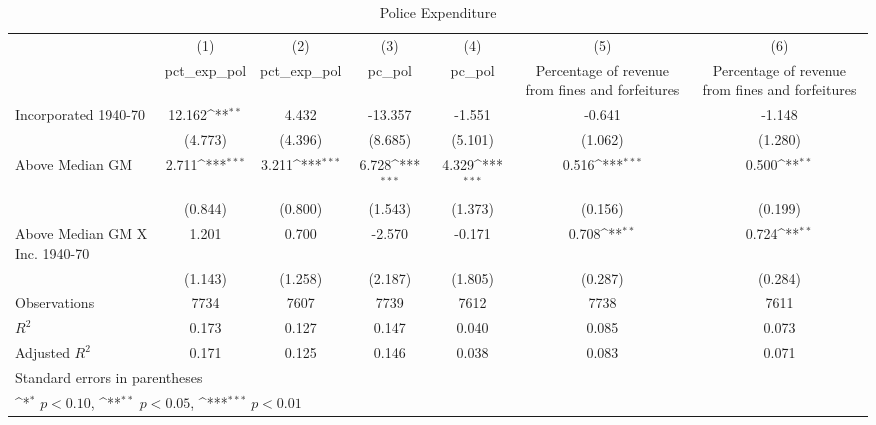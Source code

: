 \begin{table}[htbp]\centering
\def\sym#1{\ifmmode^{#1}\else\(^{#1}\)\fi}
\caption{Police Expenditure}
\begin{tabular}{l*{6}{c}}
\hline\hline
                    &\multicolumn{1}{c}{(1)}&\multicolumn{1}{c}{(2)}&\multicolumn{1}{c}{(3)}&\multicolumn{1}{c}{(4)}&\multicolumn{1}{c}{(5)}&\multicolumn{1}{c}{(6)}\\
                    &\multicolumn{1}{c}{pct\_exp\_pol}&\multicolumn{1}{c}{pct\_exp\_pol}&\multicolumn{1}{c}{pc\_pol}&\multicolumn{1}{c}{pc\_pol}&\multicolumn{1}{c}{Percentage of revenue from fines and forfeitures}&\multicolumn{1}{c}{Percentage of revenue from fines and forfeitures}\\
\hline
Incorporated 1940-70&      12.162\sym{**} &       4.432         &     -13.357         &      -1.551         &      -0.641         &      -1.148         \\
                    &     (4.773)         &     (4.396)         &     (8.685)         &     (5.101)         &     (1.062)         &     (1.280)         \\
[1em]
Above Median GM     &       2.711\sym{***}&       3.211\sym{***}&       6.728\sym{***}&       4.329\sym{***}&       0.516\sym{***}&       0.500\sym{**} \\
                    &     (0.844)         &     (0.800)         &     (1.543)         &     (1.373)         &     (0.156)         &     (0.199)         \\
[1em]
Above Median GM X Inc. 1940-70&       1.201         &       0.700         &      -2.570         &      -0.171         &       0.708\sym{**} &       0.724\sym{**} \\
                    &     (1.143)         &     (1.258)         &     (2.187)         &     (1.805)         &     (0.287)         &     (0.284)         \\
\hline
Observations        &        7734         &        7607         &        7739         &        7612         &        7738         &        7611         \\
\(R^{2}\)           &       0.173         &       0.127         &       0.147         &       0.040         &       0.085         &       0.073         \\
Adjusted \(R^{2}\)  &       0.171         &       0.125         &       0.146         &       0.038         &       0.083         &       0.071         \\
\hline\hline
\multicolumn{7}{l}{\footnotesize Standard errors in parentheses}\\
\multicolumn{7}{l}{\footnotesize \sym{*} \(p<0.10\), \sym{**} \(p<0.05\), \sym{***} \(p<0.01\)}\\
\end{tabular}
\end{table}
